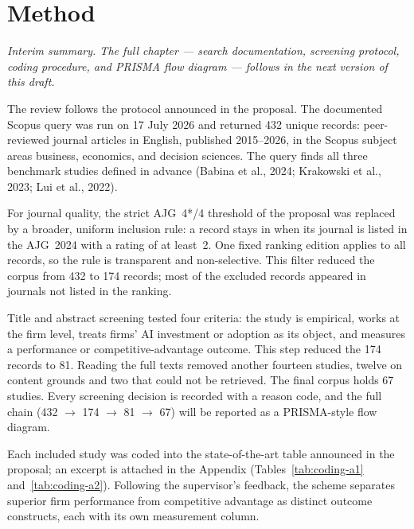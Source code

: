 \chapter{Method}
\label{sec:method-summary}

\noindent\emph{Interim summary. The full chapter --- search documentation, screening protocol, coding procedure, and PRISMA flow diagram --- follows in the next version of this draft.}

\bigskip

\noindent The review follows the protocol announced in the proposal. The documented Scopus query was run on 17 July 2026 and returned 432 unique records: peer-reviewed journal articles in English, published 2015--2026, in the Scopus subject areas business, economics, and decision sciences. The query finds all three benchmark studies defined in advance (Babina et al., 2024; Krakowski et al., 2023; Lui et al., 2022).

For journal quality, the strict AJG~4*/4 threshold of the proposal was replaced by a broader, uniform inclusion rule: a record stays in when its journal is listed in the AJG~2024 with a rating of at least~2. One fixed ranking edition applies to all records, so the rule is transparent and non-selective. This filter reduced the corpus from 432 to 174 records; most of the excluded records appeared in journals not listed in the ranking.

Title and abstract screening tested four criteria: the study is empirical, works at the firm level, treats firms' AI investment or adoption as its object, and measures a performance or competitive-advantage outcome. This step reduced the 174 records to 81. Reading the full texts removed another fourteen studies, twelve on content grounds and two that could not be retrieved. The final corpus holds 67 studies. Every screening decision is recorded with a reason code, and the full chain (432 $\rightarrow$ 174 $\rightarrow$ 81 $\rightarrow$ 67) will be reported as a PRISMA-style flow diagram.

Each included study was coded into the state-of-the-art table announced in the proposal; an excerpt is attached in the Appendix (Tables~\ref{tab:coding-a1} and~\ref{tab:coding-a2}). Following the supervisor's feedback, the scheme separates superior firm performance from competitive advantage as distinct outcome constructs, each with its own measurement column.
